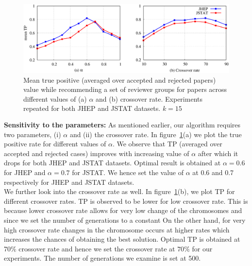 \begin{figure}
\centering
\includegraphics[scale = 0.35]{./texfiles/Chapter_4/cikm_17/figures/param_estimate.eps}
\caption{\label{fig:param_estimte} Mean true positive (averaged over accepted and rejected papers) value while recommending a set of reviewer groups for papers across different values 
of (a) $\alpha$ and (b) crossover rate. Experiments repeated for both JHEP and JSTAT datasets. $k = 15$}
\vspace{4mm}
\end{figure}

{\bf Sensitivity to the parameters:}
As mentioned earlier, our algorithm requires two parameters, (i) $\alpha$ and (ii) the crossover rate. In figure~\ref{fig:param_estimte}(a) we plot the true positive rate 
for different values of $\alpha$. We observe that TP (averaged over accepted and rejected cases) improves with increasing value of $\alpha$ after which it drops for 
both JHEP and JSTAT datasets. Optimal result is obtained at $\alpha = 0.6$ for JHEP and $\alpha = 0.7$ for JSTAT. 
We hence set the value of $\alpha$ at 0.6 and 0.7 respectively for JHEP and JSTAT datasets. \\
We further look into the crossover rate as well. In figure~\ref{fig:param_estimte}(b), we plot TP for different crossover rates. TP is observed to be lower for 
low crossover rate. This is because lower crossover rate allows for very low change of the chromosomes and since we set the number of generations to a constant  On the other hand, for very high crossover rate changes in the chromosome occurs at higher rates which increases the chances of obtaining the best solution. 
Optimal TP is obtained at 70\% crossover rate and hence we set the crossover rate at $70\%$ for our experiments. The number of generations we examine is set at 500.\\ 


